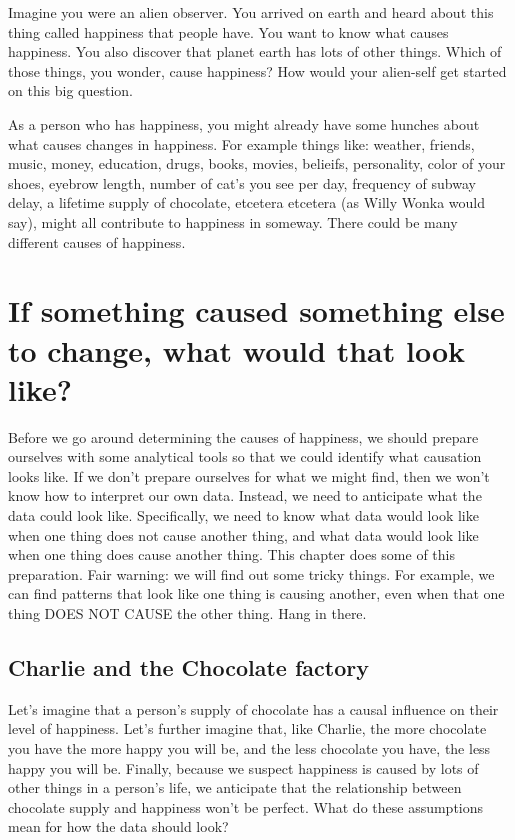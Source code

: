 \documentclass[
]{book}
\begin{document}
Imagine you were an alien observer. You arrived on earth and heard about this thing called happiness that people have. You want to know what causes happiness. You also discover that planet earth has lots of other things. Which of those things, you wonder, cause happiness? How would your alien-self get started on this big question.

As a person who has happiness, you might already have some hunches about what causes changes in happiness. For example things like: weather, friends, music, money, education, drugs, books, movies, belieifs, personality, color of your shoes, eyebrow length, number of cat's you see per day, frequency of subway delay, a lifetime supply of chocolate, etcetera etcetera (as Willy Wonka would say), might all contribute to happiness in someway. There could be many different causes of happiness.

\hypertarget{if-something-caused-something-else-to-change-what-would-that-look-like}{%
\section{If something caused something else to change, what would that look like?}\label{if-something-caused-something-else-to-change-what-would-that-look-like}}

Before we go around determining the causes of happiness, we should prepare ourselves with some analytical tools so that we could identify what causation looks like. If we don't prepare ourselves for what we might find, then we won't know how to interpret our own data. Instead, we need to anticipate what the data could look like. Specifically, we need to know what data would look like when one thing does not cause another thing, and what data would look like when one thing does cause another thing. This chapter does some of this preparation. Fair warning: we will find out some tricky things. For example, we can find patterns that look like one thing is causing another, even when that one thing DOES NOT CAUSE the other thing. Hang in there.

\hypertarget{charlie-and-the-chocolate-factory}{%
\subsection{Charlie and the Chocolate factory}\label{charlie-and-the-chocolate-factory}}

Let's imagine that a person's supply of chocolate has a causal influence on their level of happiness. Let's further imagine that, like Charlie, the more chocolate you have the more happy you will be, and the less chocolate you have, the less happy you will be. Finally, because we suspect happiness is caused by lots of other things in a person's life, we anticipate that the relationship between chocolate supply and happiness won't be perfect. What do these assumptions mean for how the data should look?
\end{document}
